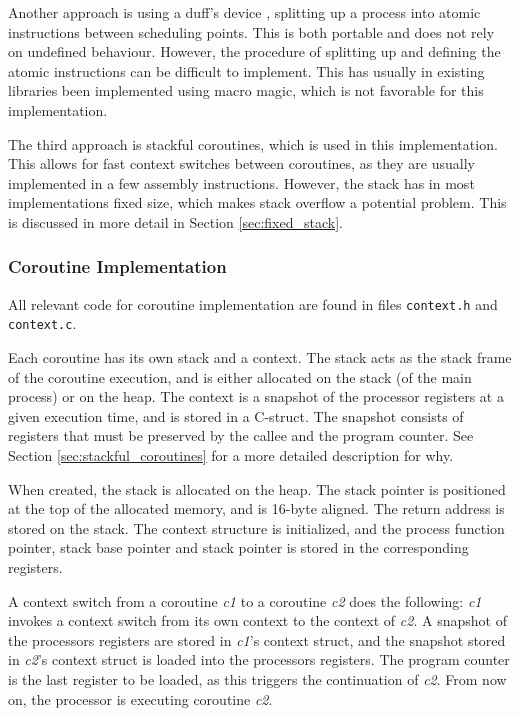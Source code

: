 Another approach is using a duff's device \citep{duffsdevice}, splitting up a process into atomic instructions between scheduling points. This is both portable and does not rely on undefined behaviour. However, the procedure of splitting up and defining the atomic instructions can be difficult to implement. This has usually in existing libraries been implemented using macro magic, which is not favorable for this implementation.

The third approach is stackful coroutines, which is used in this implementation. This allows for fast context switches between coroutines, as they are usually implemented in a few assembly instructions. However, the stack has in most implementations fixed size, which makes stack overflow a potential problem. This is discussed in more detail in Section \ref{sec:fixed_stack}. 


\subsubsection{Coroutine Implementation}

All relevant code for coroutine implementation are found in files \texttt{context.h} and \texttt{context.c}.

Each coroutine has its own stack and a context. The stack acts as the stack frame of the coroutine execution, and is either allocated on the stack (of the main process) or on the heap. The context is a snapshot of the processor registers at a given execution time, and is stored in a C\hyp{}struct. The snapshot consists of registers that must be preserved by the callee and the program counter. See Section \ref{sec:stackful_coroutines} for a more detailed description for why.

When created, the stack is allocated on the heap. The stack pointer is positioned at the top of the allocated memory, and is 16\hyp{}byte aligned. The return address is stored on the stack. The context structure is initialized, and the process function pointer, stack base pointer and stack pointer is stored in the corresponding registers.

A context switch from a coroutine \textit{c1} to a coroutine \textit{c2} does the following: \textit{c1} invokes a context switch from its own context to the context of \textit{c2}. A snapshot of the processors registers are stored in \textit{c1}'s context struct, and the snapshot stored in \textit{c2}'s context struct is loaded into the processors registers. The program counter is the last register to be loaded, as this triggers the continuation of \textit{c2}. From now on, the processor is executing coroutine \textit{c2}.

